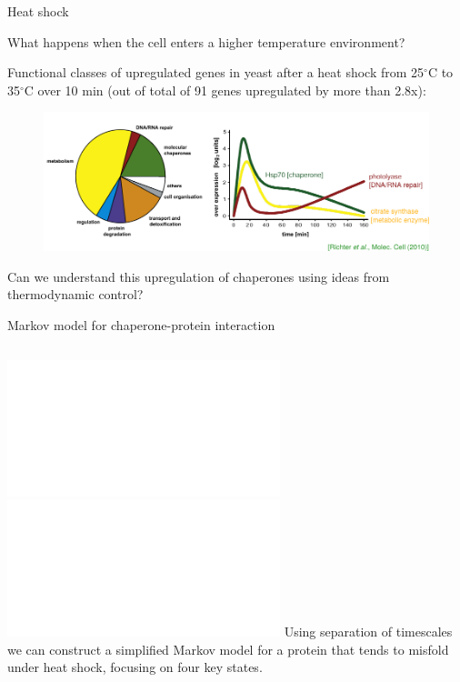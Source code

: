 \documentclass{beamer}
\begin{document}
\begin{frame}{Heat shock}

  {What happens when the cell enters a higher temperature environment?\\[1em]}

  \pause

{\small  Functional classes of upregulated genes in yeast after a heat shock from 25$^\circ$C to 35$^\circ$C over 10 min (out of total of 91 genes upregulated by more than 2.8x):}
  \vspace{1em}
  \begin{figure}
    \includegraphics[width=\textwidth]{yeast_response.pdf}
  \end{figure}

  \pause

\alert{\small Can we understand this upregulation of chaperones using ideas from thermodynamic control?}

\end{frame}

\begin{frame}{Markov model for chaperone-protein interaction}

  \vspace{-1em}
  \begin{columns}
    \includegraphics<1>[width=\textwidth]{markov0.pdf}\includegraphics<2>[width=\textwidth]{markov0b.pdf}
     Using separation of timescales we can
    construct a simplified {\color{blue} Markov model} for a protein that tends to
    misfold under heat shock, focusing on four key states.
    \end{columns}
\end{frame}
\end{document}
